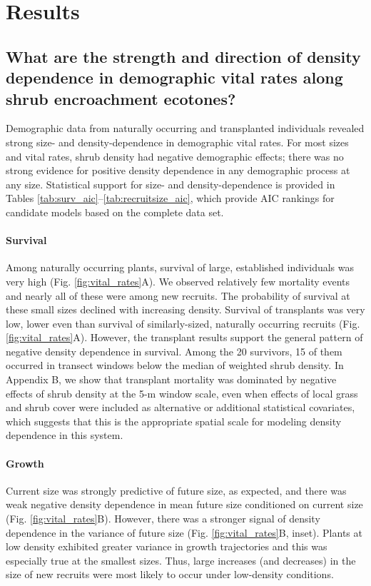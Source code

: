 \documentclass[11pt]{article}\usepackage[]{graphicx}\usepackage[usenames,dvipsnames]{xcolor}
\begin{document}
\section*{Results}

\subsection*{What are the strength and direction of density dependence in demographic vital rates along shrub encroachment ecotones?}
Demographic data from naturally occurring and transplanted individuals revealed strong size- and density-dependence in demographic vital rates. 
For most sizes and vital rates, shrub density had negative demographic effects; there was no strong evidence for positive density dependence in any demographic process at any size. 
Statistical support for size- and density-dependence is provided in Tables \ref{tab:surv_aic}--\ref{tab:recruitsize_aic}, which provide AIC rankings for candidate models based on the complete data set. 

\paragraph{Survival}
Among naturally occurring plants, survival of large, established individuals was very high (Fig. \ref{fig:vital_rates}A).
We observed relatively few mortality events and nearly all of these were among new recruits. 
The probability of survival at these small sizes declined with increasing density. 
Survival of transplants was very low, lower even than survival of similarly-sized, naturally occurring recruits (Fig. \ref{fig:vital_rates}A). 
However, the transplant results support the general pattern of negative density dependence in survival. 
Among the 20 survivors, 15 of them occurred in transect windows below the median of weighted shrub density. 
In Appendix B, we show that transplant mortality was dominated by negative effects of shrub density at the 5-m window scale, even when effects of local grass and shrub cover were included as alternative or additional statistical covariates, which suggests that this is the appropriate spatial scale for modeling density dependence in this system. 

\paragraph{Growth}
Current size was strongly predictive of future size, as expected, and there was weak negative density dependence in mean future size conditioned on current size (Fig. \ref{fig:vital_rates}B). 
However, there was a stronger signal of density dependence in the variance of future size (Fig. \ref{fig:vital_rates}B, inset).
Plants at low density exhibited greater variance in growth trajectories and this was especially true at the smallest sizes. 
Thus, large increases (and decreases) in the size of new recruits were most likely to occur under low-density conditions. 
\end{document}
